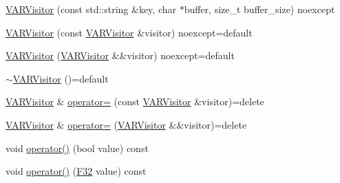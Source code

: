 \begin{DoxyCompactItemize}
\item 
\mbox{\hyperlink{classmage_1_1loader_1_1anonymous__namespace_02var__writer_8cpp_03_1_1_v_a_r_visitor_afcf7b30fed957c8ba2b76394e21e45d1}{V\+A\+R\+Visitor}} (const std\+::string \&key, char $\ast$buffer, size\+\_\+t buffer\+\_\+size) noexcept
\item 
\mbox{\hyperlink{classmage_1_1loader_1_1anonymous__namespace_02var__writer_8cpp_03_1_1_v_a_r_visitor_a82f3a1a67bf514b9ac2ed972cf31d039}{V\+A\+R\+Visitor}} (const \mbox{\hyperlink{classmage_1_1loader_1_1anonymous__namespace_02var__writer_8cpp_03_1_1_v_a_r_visitor}{V\+A\+R\+Visitor}} \&visitor) noexcept=default
\item 
\mbox{\hyperlink{classmage_1_1loader_1_1anonymous__namespace_02var__writer_8cpp_03_1_1_v_a_r_visitor_a6d58f255b7449eee24a08dacacebdeec}{V\+A\+R\+Visitor}} (\mbox{\hyperlink{classmage_1_1loader_1_1anonymous__namespace_02var__writer_8cpp_03_1_1_v_a_r_visitor}{V\+A\+R\+Visitor}} \&\&visitor) noexcept=default
\item 
\mbox{\hyperlink{classmage_1_1loader_1_1anonymous__namespace_02var__writer_8cpp_03_1_1_v_a_r_visitor_afc2fb3e2bb3ca6987962a083ecb09f67}{$\sim$\+V\+A\+R\+Visitor}} ()=default
\item 
\mbox{\hyperlink{classmage_1_1loader_1_1anonymous__namespace_02var__writer_8cpp_03_1_1_v_a_r_visitor}{V\+A\+R\+Visitor}} \& \mbox{\hyperlink{classmage_1_1loader_1_1anonymous__namespace_02var__writer_8cpp_03_1_1_v_a_r_visitor_a5945e980f4521469baea5ef944bb0a83}{operator=}} (const \mbox{\hyperlink{classmage_1_1loader_1_1anonymous__namespace_02var__writer_8cpp_03_1_1_v_a_r_visitor}{V\+A\+R\+Visitor}} \&visitor)=delete
\item 
\mbox{\hyperlink{classmage_1_1loader_1_1anonymous__namespace_02var__writer_8cpp_03_1_1_v_a_r_visitor}{V\+A\+R\+Visitor}} \& \mbox{\hyperlink{classmage_1_1loader_1_1anonymous__namespace_02var__writer_8cpp_03_1_1_v_a_r_visitor_a1881ef3c23c5d0085323928643176691}{operator=}} (\mbox{\hyperlink{classmage_1_1loader_1_1anonymous__namespace_02var__writer_8cpp_03_1_1_v_a_r_visitor}{V\+A\+R\+Visitor}} \&\&visitor)=delete
\item 
void \mbox{\hyperlink{classmage_1_1loader_1_1anonymous__namespace_02var__writer_8cpp_03_1_1_v_a_r_visitor_a6a0c368047637e4403f6d6d9d9a78aa7}{operator()}} (bool value) const
\item 
void \mbox{\hyperlink{classmage_1_1loader_1_1anonymous__namespace_02var__writer_8cpp_03_1_1_v_a_r_visitor_a12cb72ace7aef15fcd021599a5bd2b60}{operator()}} (\mbox{\hyperlink{namespacemage_aa97e833b45f06d60a0a9c4fc22ae02c0}{F32}} value) const

\end{DoxyCompactItemize}
